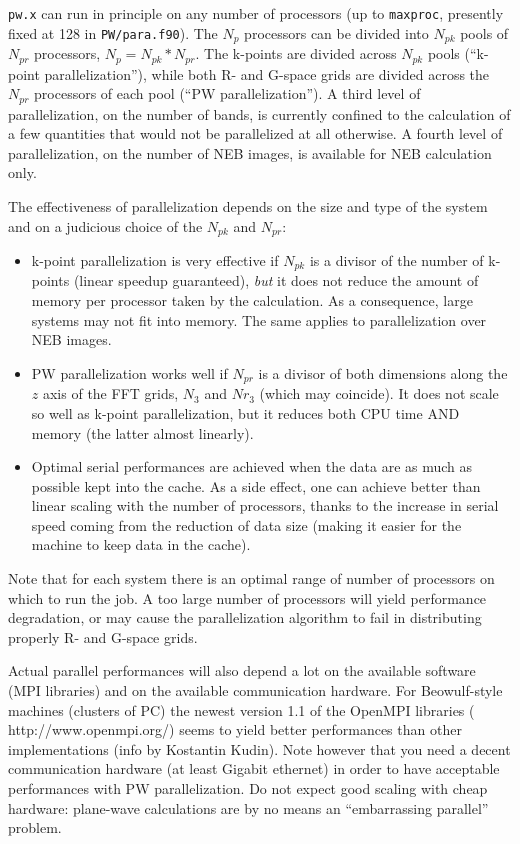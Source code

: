\documentclass[12pt,a4paper]{article}
\begin{document}
\texttt{pw.x} can run in principle on any number of processors (up to
\texttt{maxproc}, presently fixed at 128 in \texttt{PW/para.f90}). 
The $N_p$ processors can be divided into $N_{pk}$ pools of $N_{pr}$
processors, $N_p=N_{pk}*N_{pr}$. 
The k-points are divided across $N_{pk}$ pools (``k-point
parallelization''), while both R- and G-space grids are divided across
the $N_{pr}$ processors of each pool (``PW parallelization'').
A third level of parallelization, on the number of bands, is 
currently confined to the calculation of a few quantities that 
would not be parallelized at all otherwise.
A fourth level of parallelization, on the number of NEB images,
is available for NEB calculation only.

The effectiveness of parallelization depends on the size and type of
the system and on a judicious choice of the $N_{pk}$ and $N_{pr}$:

\begin{itemize}
  \item
    k-point parallelization is very effective if $N_{pk}$ is a divisor
    of the number of k-points (linear speedup guaranteed), \emph{but}
    it does not reduce the amount of memory per processor taken by the
    calculation.
    As a consequence, large systems may not fit into memory.
    The same applies to parallelization over NEB images.
  \item
    PW parallelization works well if $N_{pr}$ is a divisor of both
    dimensions along the $z$ axis of the FFT grids, $N_3$ and $Nr_3$
    (which may coincide).
    It does not scale so well as k-point parallelization, but it
    reduces both CPU time AND memory (the latter almost linearly).
  \item
    Optimal serial performances are achieved when the data are as much
    as possible kept into the cache.
    As a side effect, one can achieve better than linear scaling with
    the number of processors, thanks to the increase in serial speed
    coming from the reduction of data size (making it easier for the
    machine to keep data in the cache).  
\end{itemize}

Note that for each system there is an optimal range of number of 
processors on which to run the job.
A too large number of processors will yield performance degradation,
or may cause the parallelization algorithm to fail in distributing
properly R- and G-space grids.

Actual parallel performances will also depend a lot on the available 
software (MPI libraries) and on the available communication hardware. 
For Beowulf-style machines (clusters of PC) the newest version 1.1
of the OpenMPI libraries (%
{http://www.openmpi.org/}) seems to yield better performances 
than other implementations (info by Kostantin Kudin). 
Note however that you need a decent communication hardware (at least 
Gigabit ethernet) in order to have acceptable performances with PW 
parallelization.
Do not expect good scaling with cheap hardware: plane-wave
calculations are by no means an ``embarrassing parallel'' problem. 
\end{document}
